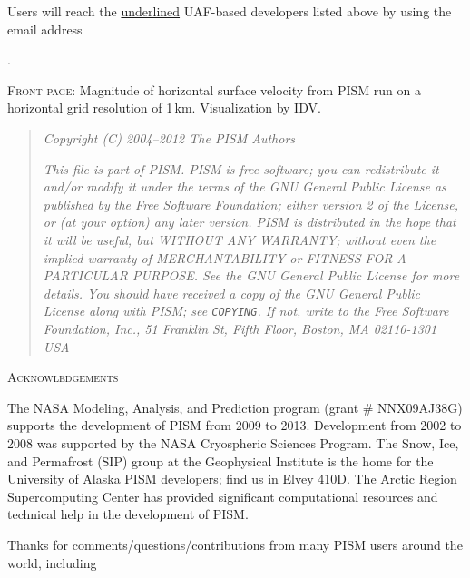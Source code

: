 \documentclass[titlepage,letterpaper,final]{scrartcl}
\begin{document}
\bigskip\bigskip
Users will reach the \underline{underlined} UAF-based developers listed above by using the email address

\centerline{ \PISMEMAIL.  }

\bigskip\bigskip
\noindent \textsc{Front page}:  Magnitude of horizontal surface velocity from PISM run on a horizontal grid resolution of 1\,km.  Visualization by IDV.

\vfill

\newpage
\vspace{0.2in}
\begin{quote}
\textsl{Copyright (C) 2004--2012 The PISM Authors}
\medskip

\noindent \textsl{This file is part of PISM.  PISM is free software; you can redistribute it and/or modify it under the terms of the GNU General Public License as published by the Free Software Foundation; either version 2 of the License, or (at your option) any later version.  PISM is distributed in the hope that it will be useful, but WITHOUT ANY WARRANTY; without even the implied warranty of MERCHANTABILITY or FITNESS FOR A PARTICULAR PURPOSE.  See the GNU General Public License for more details.  You should have received a copy of the GNU General Public License along with PISM; see \emph{\texttt{COPYING}}.  If not, write to the Free Software Foundation, Inc., 51 Franklin St, Fifth Floor, Boston, MA  02110-1301 USA}
\end{quote}
\vspace{0.5in}

\centerline{\textsc{Acknowledgements}}
\bigskip

\small
The NASA Modeling, Analysis, and Prediction program (grant \# NNX09AJ38G) supports the development of PISM from 2009 to 2013.  Development from 2002 to 2008 was supported by the NASA Cryospheric Sciences Program.  The Snow, Ice, and Permafrost (SIP) group at the Geophysical Institute is the home for the University of Alaska PISM developers; find us in Elvey 410D.  The Arctic Region Supercomputing Center has provided significant computational resources and technical help in the development of PISM.

Thanks for comments/questions/contributions from many PISM users around the world, including
\end{document}
